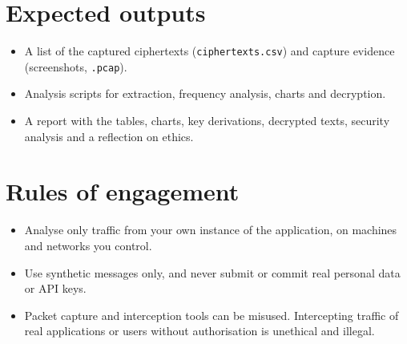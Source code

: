\documentclass[11pt,a4paper]{article}
\newcommand{\ct}[1]{\texttt{#1}}
\begin{document}
\section*{Expected outputs}
\begin{itemize}
\item A list of the captured ciphertexts (\ct{ciphertexts.csv}) and capture evidence (screenshots, \ct{.pcap}).
\item Analysis scripts for extraction, frequency analysis, charts and decryption.
\item A report with the tables, charts, key derivations, decrypted texts, security analysis and a reflection on
      ethics.
\end{itemize}

\section*{Rules of engagement}
\begin{itemize}
\item Analyse only traffic from your own instance of the application, on machines and networks you control.
\item Use synthetic messages only, and never submit or commit real personal data or API keys.
\item Packet capture and interception tools can be misused. Intercepting traffic of real applications or users
      without authorisation is unethical and illegal.
\end{itemize}
\end{document}
